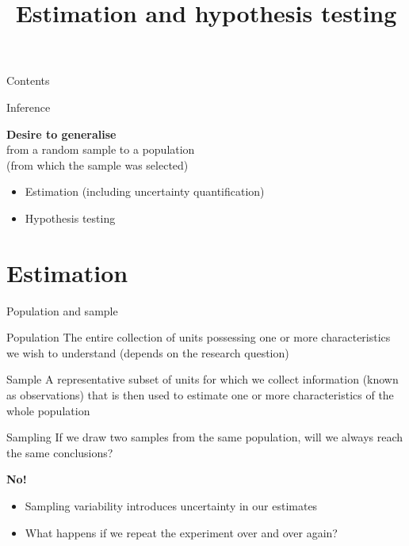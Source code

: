 

\title{Estimation and hypothesis testing}



\maketitle

\begin{frame}{Contents}
    \tableofcontents[hideallsubsections]
\end{frame}

\begin{frame}{Inference}
    \begin{center}
        {\LARGE%
         \textbf{Desire to generalise}} \\[\medskipamount]
        from a random sample to a population \\
        (from which the sample was selected)
    \end{center}
    \vfill
    \begin{itemize}
        \item Estimation (including uncertainty quantification)
        \item Hypothesis testing
    \end{itemize}
\end{frame}

\section{Estimation}

\begin{frame}{Population and sample}
    \begin{block}{Population}
        The \alert{entire collection of units} possessing one or more
        characteristics we wish to understand (depends on the research question)
    \end{block}
    \vfill
    \begin{block}{Sample}
        A \alert{representative subset} of units for which we collect
        information (known as \alert{observations}) that is then used to
        \alert{estimate} one or more characteristics of the whole population
    \end{block}
\end{frame}

\begin{frame}{Sampling}
    If we draw two samples from the same population, will we always reach the
    same conclusions?
    \vfill\pause
    \begin{center}
        \LARGE%
        \textbf{No!}
    \end{center}
    \begin{itemize}
        \item Sampling variability introduces \alert{uncertainty} in our
              estimates
        \item What happens if we repeat the experiment over and over again?
    \end{itemize}
\end{frame}

